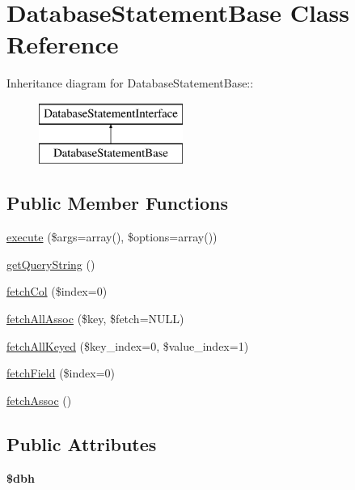 \hypertarget{classDatabaseStatementBase}{
\section{DatabaseStatementBase Class Reference}
\label{classDatabaseStatementBase}
}
Inheritance diagram for DatabaseStatementBase::\begin{figure}[H]
\begin{center}
\leavevmode
\includegraphics[height=2cm]{classDatabaseStatementBase}
\end{center}
\end{figure}
\subsection*{Public Member Functions}
\begin{DoxyCompactItemize}
\item 
\hyperlink{classDatabaseStatementBase_a21521f5da2bf06d851bfb782c0d21b52}{execute} (\$args=array(), \$options=array())
\item 
\hyperlink{classDatabaseStatementBase_afc56564e99ad8fe9c8c2549f77c37b3c}{getQueryString} ()
\item 
\hyperlink{classDatabaseStatementBase_a0f1eb97063c61c3c0dc98b946595bc5b}{fetchCol} (\$index=0)
\item 
\hyperlink{classDatabaseStatementBase_a7ed7713a07605775cf41019d52b65f35}{fetchAllAssoc} (\$key, \$fetch=NULL)
\item 
\hyperlink{classDatabaseStatementBase_a1083f1060fd59bec06a7ae14dbc0b307}{fetchAllKeyed} (\$key\_\-index=0, \$value\_\-index=1)
\item 
\hyperlink{classDatabaseStatementBase_ad80ef261e8934f5c69422f7530aa4cdc}{fetchField} (\$index=0)
\item 
\hyperlink{classDatabaseStatementBase_af1eb19aab88b13d6045bd6cce1b3c573}{fetchAssoc} ()
\end{DoxyCompactItemize}
\subsection*{Public Attributes}
\begin{DoxyCompactItemize}
\item 
\hypertarget{classDatabaseStatementBase_a27936318a48921d4cb271803ea786880}{
{\bfseries \$dbh}}
\label{classDatabaseStatementBase_a27936318a48921d4cb271803ea786880}

\end{DoxyCompactItemize}
